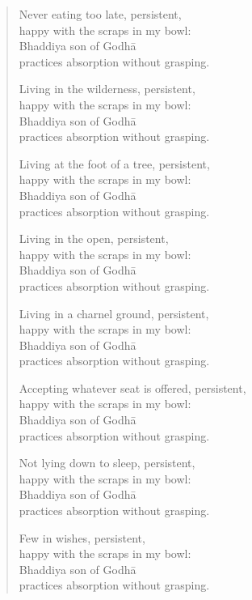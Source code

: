 \documentclass[12pt,openany]{book}%
\begin{document}
\begin{verse}
Never eating too late, persistent, \\
happy with the scraps in my bowl: \\
Bhaddiya son of \textsanskrit{Godhā} \\
practices absorption without grasping. 

Living in the wilderness, persistent, \\
happy with the scraps in my bowl: \\
Bhaddiya son of \textsanskrit{Godhā} \\
practices absorption without grasping. 

Living at the foot of a tree, persistent, \\
happy with the scraps in my bowl: \\
Bhaddiya son of \textsanskrit{Godhā} \\
practices absorption without grasping. 

Living in the open, persistent, \\
happy with the scraps in my bowl: \\
Bhaddiya son of \textsanskrit{Godhā} \\
practices absorption without grasping. 

Living in a charnel ground, persistent, \\
happy with the scraps in my bowl: \\
Bhaddiya son of \textsanskrit{Godhā} \\
practices absorption without grasping. 

Accepting whatever seat is offered, persistent, \\
happy with the scraps in my bowl: \\
Bhaddiya son of \textsanskrit{Godhā} \\
practices absorption without grasping. 

Not lying down to sleep, persistent, \\
happy with the scraps in my bowl: \\
Bhaddiya son of \textsanskrit{Godhā} \\
practices absorption without grasping. 

Few in wishes, persistent, \\
happy with the scraps in my bowl: \\
Bhaddiya son of \textsanskrit{Godhā} \\
practices absorption without grasping. 


\end{verse}
\end{document}
